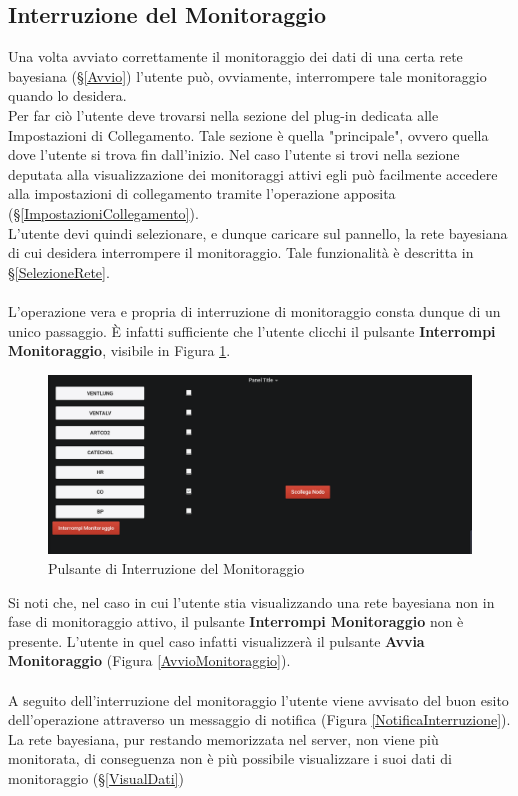 \subsection{Interruzione del Monitoraggio}\label{Interruzione}

Una volta avviato correttamente il monitoraggio dei dati di una certa rete bayesiana (§\ref{Avvio}) l'utente può, ovviamente, interrompere tale monitoraggio quando lo desidera.\\
Per far ciò l'utente deve trovarsi nella sezione del plug-in dedicata alle Impostazioni di Collegamento. Tale sezione è quella "principale", ovvero quella dove l'utente si trova fin dall'inizio. Nel caso l'utente si trovi nella sezione deputata alla visualizzazione dei monitoraggi attivi egli può facilmente accedere alla impostazioni di collegamento tramite l'operazione apposita (§\ref{ImpostazioniCollegamento}).\\
L'utente devi quindi selezionare, e dunque caricare sul pannello, la rete bayesiana di cui desidera interrompere il monitoraggio. Tale funzionalità è descritta in §\ref{SelezioneRete}.\\
~\\
L'operazione vera e propria di interruzione di monitoraggio consta dunque di un unico passaggio. È infatti sufficiente che l'utente clicchi il pulsante \textbf{Interrompi Monitoraggio}, visibile in Figura \ref{InterruzioneMonitoraggio}.

\begin{figure}[H]
	\begin{center}
		\includegraphics[scale=0.4]{./images/InterruzioneMonitoraggio.png}
		 \caption{Pulsante di Interruzione del Monitoraggio}	
		 \label{InterruzioneMonitoraggio}
	\end{center}
\end{figure}

Si noti che, nel caso in cui l'utente stia visualizzando una rete bayesiana non in fase di monitoraggio attivo, il pulsante \textbf{Interrompi Monitoraggio} non è presente. L'utente in quel caso infatti visualizzerà il pulsante \textbf{Avvia Monitoraggio} (Figura \ref{AvvioMonitoraggio}).\\
~\\
A seguito dell'interruzione del monitoraggio l'utente viene avvisato del buon esito dell'operazione attraverso un messaggio di notifica (Figura \ref{NotificaInterruzione}). La rete bayesiana, pur restando memorizzata nel server, non viene più monitorata, di conseguenza non è più possibile visualizzare i suoi dati di monitoraggio (§\ref{VisualDati})

